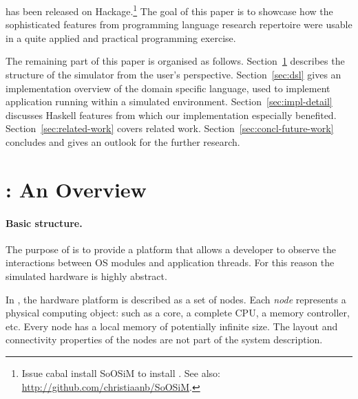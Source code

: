 \soosim has been released on Hackage.\footnote{Issue \textsf{cabal install SoOSiM} to install \soosim. See also: \url{http://github.com/christiaanb/SoOSiM}.}
  The goal of
this paper is to showcase how the sophisticated features from
programming language research repertoire were usable in a quite
applied and practical programming exercise.

The remaining part of this paper is organised as follows.
Section~\ref{sec:soosim-an-overview} describes the structure of the \soosim simulator from the user's perspective.
Section~\ref{sec:dsl} gives an implementation overview of the domain specific language, used to implement application running within a \soosim simulated environment.
Section~\ref{sec:impl-detail} discusses Haskell features from which our implementation especially benefited.
Section~\ref{sec:related-work} covers related work.
Section~\ref{sec:concl-future-work} concludes and gives an outlook for the further research.

\section{\soosim: An Overview}
\label{sec:soosim-an-overview}

\paragraph{Basic structure.}
The purpose of \soosim is to provide a platform that allows a developer to observe the interactions between OS modules and application threads.
For this reason the simulated hardware is highly abstract.

In \soosim, the hardware platform is described as a set of nodes.
Each \emph{node} represents a physical computing object: such as a core, a complete CPU, a memory controller, etc.
Every node has a local memory of potentially infinite size.
The layout and connectivity properties of the nodes are not part of the system description.

